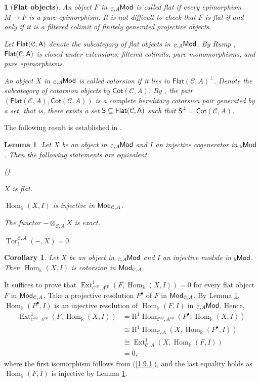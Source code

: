 \documentclass{amsart}
\theoremstyle{bfupright head,slanted body}
\theoremstyle{bfupright head,upright body}
\newtheorem{bfhpg}[res]{}               \newtheorem*{bfhpg*}{}
\theoremstyle{fixed bf head,slanted body}
\newtheorem{cor}[res]{Corollary}        \newtheorem*{cor*}{Corollary}
\newtheorem{lem}[res]{Lemma}            \newtheorem*{lem*}{Lemma}
\theoremstyle{fixed bf head,upright body}
\theoremstyle{numbered paragraph}
\newlength{\thmlistleft}        %
\newlength{\thmlistright}       %
\newlength{\thmlistpartopsep}   %
\newlength{\thmlisttopsep}      %
\newlength{\thmlistparsep}      %
\newlength{\thmlistitemsep}     %
\newcounter{eqc}
\newenvironment{eqc}{\begin{list}{\upshape (\textit{\roman{eqc}})}%
		{\usecounter{eqc}%
			\setlength{\leftmargin}{\thmlistleft}%
			\setlength{\labelwidth}{\thmlistleft}%
			\setlength{\rightmargin}{\thmlistright}%
			\setlength{\partopsep}{\thmlistpartopsep}%
			\setlength{\topsep}{\thmlisttopsep}%
			\setlength{\parsep}{\thmlistparsep}%
			\setlength{\itemsep}{\thmlistitemsep}}}%
	{\end{list}}%
\newenvironment{prf*}[1][Proof]{%
	\begin{proof}[\bf #1]
		\setcounter{equation}{0}
		\renewcommand{\theequation}{\arabic{equation}}}
	{\end{proof}
}
\numberwithin{equation}{res}
\newcommand{\Flat}[1]{\mathsf{Flat}(#1)}
\newcommand{\Cot}[1]{\mathsf{Cot}(#1)}
\newcommand{\Hom}[3][]{\operatorname{Hom}_{#1}(#2,#3)}
\newcommand{\Ext}[4][]{\operatorname{Ext}_{#1}^{#2}(#3,#4)}
\newcommand{\Tor}[4][]{\operatorname{Tor}_{#2}^{#1}(#3,#4)}
\newcommand{\Se}{\mathsf{S}}
\newcommand{\C}{\mathcal{C}}
\newcommand{\kk}{\Bbbk}
\newcommand{\lMod}[1]{{}_{#1}\mspace{-1mu}{\sf{Mod}}}
\newcommand{\rMod}[1]{{\sf{Mod}}_{#1}}
\begin{document}
\begin{bfhpg}[\bf Flat objects]\label{representable}
An object $F$ in $\lMod{\C,A}$ is called \emph{flat} if every epimorphism $M\to F$ is a pure epimorphism. It is not difficult to check that $F$ is flat if and only if it is a filtered colimit of finitely generated projective objects.

Let ${\sf Flat(\C,A)}$ denote the subcategory of flat objects in $\lMod{\C,A}$. By Rump \cite[Proposition 7]{Ru10}, ${\sf Flat(\C,A)}$ is closed under extensions, filtered colimits, pure monomorphisms, and pure epimorphisms.

An object $X$ in $\lMod{\C,A}$ is called \textit{cotorsion} if it lies in $\Flat{\C,A}^\perp$. Denote the subcategory of cotorsion objects by $\Cot{\C,A}$.
By \cite[Theorem A.3]{HJ21}, the pair $(\Flat{\C,A}, \Cot{\C,A})$ is a complete hereditary cotorsion pair generated by a set, that is, there exists a set $\Se\subseteq{\sf \Flat{\C,A}}$ such that $\Se^\perp=\Cot{\C,A}$.
\end{bfhpg}

The following result is established in \cite[Theorem 3]{St68}.

\begin{lem}\label{flat-inj}
Let $X$ be an object in $\lMod{\C,A}$ and $I$ an injective cogenerator in $\lMod{\Bbbk}$. Then the following statements are equivalent.
\begin{eqc}
\item $X$ is flat.
\item $\Hom[\Bbbk]{X}{I}$ is injective in $\rMod{\C,A}$.
\item The functor $-\otimes_{\C,A}X$ is exact.
\item $\Tor[\C,A]{1}{-}{X}=0$.
\end{eqc}
\end{lem}

\begin{cor}\label{cotorsion}
Let $X$ be an object in $\lMod{\C,A}$ and $I$ an injective module in $\lMod{\Bbbk}$. Then $\Hom[\Bbbk]{X}{I}$ is cotorsion in $\rMod{\C,A}$.
\end{cor}
\begin{prf*}
It suffices to prove that $\Ext[\C^{\mathrm{op}},A^{\mathrm{op}}]{1}{F}{\Hom[\Bbbk]{X}{I}}=0$ for every flat object $F$ in $\rMod{\C,A}$.
Take a projective resolution $P^{\bullet}$ of $F$ in $\rMod{\C,A}$.
By Lemma \ref{flat-inj}, $\Hom[\Bbbk]{P^{\bullet}}{I}$ is an injective resolution of $\Hom[\kk]{F}{I}$ in $\lMod{\C,A}$. Hence,
\begin{align*}
\Ext[\C^{\mathrm{op}},A^{\mathrm{op}}]{1}{F}{\Hom[\Bbbk]{X}{I}}
&=\mathrm{H}^{1}\Hom[\C^{\mathrm{op}},A^{\mathrm{op}}]{P^{\bullet}}{\Hom[\Bbbk]{X}{I}}\\
&\cong \mathrm{H}^{1}\Hom[\C,A]{X}{\Hom[\Bbbk]{P^{\bullet}}{I}}                   \\
&\cong \Ext[\C,A]{1}{X}{\Hom[\Bbbk]{F}{I}}                                       \\
&= 0,
\end{align*}
where the first isomorphism follows from (\ref{1.9.1}), and the last equality holds as $\Hom[\kk]{F}{I}$ is injective by Lemma \ref{flat-inj}.
\end{prf*}
\end{document}
